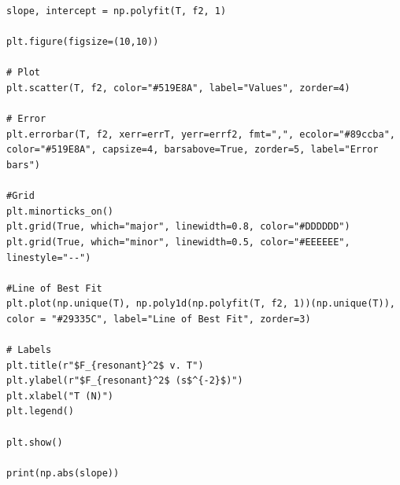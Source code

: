 \documentclass[12pt]{article}
\begin{document}
\begin{minipage}{\linewidth}
\captionsetup{hypcap=false}

\begin{mintedbox}
\begin{verbatim}
slope, intercept = np.polyfit(T, f2, 1)

plt.figure(figsize=(10,10))

# Plot
plt.scatter(T, f2, color="#519E8A", label="Values", zorder=4)

# Error
plt.errorbar(T, f2, xerr=errT, yerr=errf2, fmt=",", ecolor="#89ccba", color="#519E8A", capsize=4, barsabove=True, zorder=5, label="Error bars")

#Grid
plt.minorticks_on()
plt.grid(True, which="major", linewidth=0.8, color="#DDDDDD")
plt.grid(True, which="minor", linewidth=0.5, color="#EEEEEE", linestyle="--")

#Line of Best Fit
plt.plot(np.unique(T), np.poly1d(np.polyfit(T, f2, 1))(np.unique(T)), color = "#29335C", label="Line of Best Fit", zorder=3)

# Labels
plt.title(r"$F_{resonant}^2$ v. T")
plt.ylabel(r"$F_{resonant}^2$ (s$^{-2}$)")
plt.xlabel("T (N)")
plt.legend()

plt.show()

print(np.abs(slope))

\end{verbatim}
\end{mintedbox}
\end{minipage}
    
\end{document}
